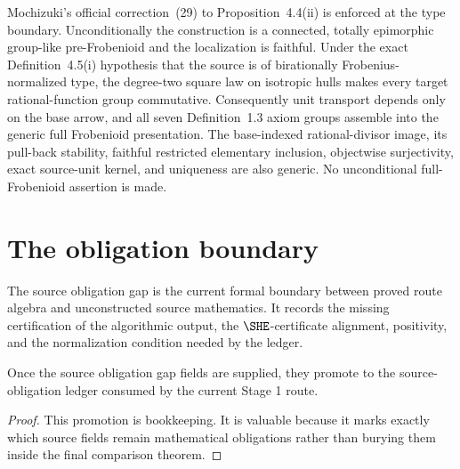 \begin{definition}
  Mochizuki's official correction~(29) to Proposition~4.4(ii) is enforced at
  the type boundary.  Unconditionally the construction is a connected,
  totally epimorphic group-like pre-Frobenioid and the localization is
  faithful.  Under the exact Definition~4.5(i) hypothesis that the source is
  of birationally Frobenius-normalized type, the degree-two square law on
  isotropic hulls makes every target rational-function group commutative.
  Consequently unit transport depends only on the base arrow, and all seven
  Definition~1.3 axiom groups assemble into the generic full Frobenioid
  presentation.  The base-indexed rational-divisor image, its pull-back
  stability, faithful restricted elementary inclusion, objectwise
  surjectivity, exact source-unit kernel, and uniqueness are also generic.
  No unconditional full-Frobenioid assertion is made.
\end{definition}

\section{The obligation boundary}

\begin{definition}
  \label{def:source-obligation-gap}
  \leanok
  The source obligation gap is the current formal boundary between proved
  route algebra and unconstructed source mathematics.  It records the missing
  certification of the algorithmic output, the \(\SHE\)-certificate alignment,
  \qPilot{} positivity, and the normalization condition needed by the ledger.
\end{definition}

\begin{proposition}
  \label{prop:gap-promotion-formal}
  \leanok
  Once the source obligation gap fields are supplied, they promote to the
  source-obligation ledger consumed by the current Stage 1 route.
\end{proposition}

\begin{proof}
  This promotion is bookkeeping.  It is valuable because it marks exactly which
  source fields remain mathematical obligations rather than burying them inside
  the final comparison theorem.
\end{proof}

